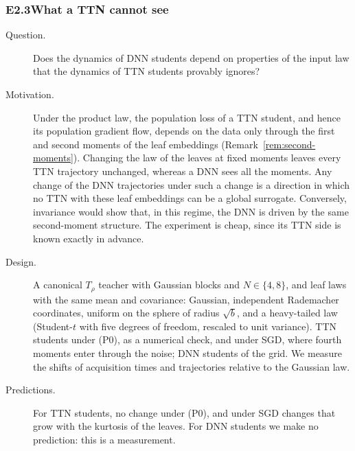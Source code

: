 \documentclass[11pt]{article}
\theoremstyle{definition}
\numberwithin{equation}{section}
\begin{document}
\subsubsection*{E2.3\quad What a TTN cannot see}
\begin{description}
\item[Question.] Does the dynamics of DNN students depend on properties of the input law that the dynamics of TTN students provably ignores?
\item[Motivation.] Under the product law, the population loss of a TTN student, and hence its population gradient flow, depends on the data only through the first and second moments of the leaf embeddings (Remark~\ref{rem:second-moments}). Changing the law of the leaves at fixed moments leaves every TTN trajectory unchanged, whereas a DNN sees all the moments. Any change of the DNN trajectories under such a change is a direction in which no TTN with these leaf embeddings can be a global surrogate. Conversely, invariance would show that, in this regime, the DNN is driven by the same second-moment structure. The experiment is cheap, since its TTN side is known exactly in advance.
\item[Design.] A canonical $T_\rho$ teacher with Gaussian blocks and $N\in\{4,8\}$, and leaf laws with the same mean and covariance: Gaussian, independent Rademacher coordinates, uniform on the sphere of radius $\sqrt b$, and a heavy-tailed law (Student-$t$ with five degrees of freedom, rescaled to unit variance). TTN students under (P0), as a numerical check, and under SGD, where fourth moments enter through the noise; DNN students of the grid. We measure the shifts of acquisition times and trajectories relative to the Gaussian law.
\item[Predictions.] For TTN students, no change under (P0), and under SGD changes that grow with the kurtosis of the leaves. For DNN students we make no prediction: this is a measurement.
\end{description}
\end{document}
